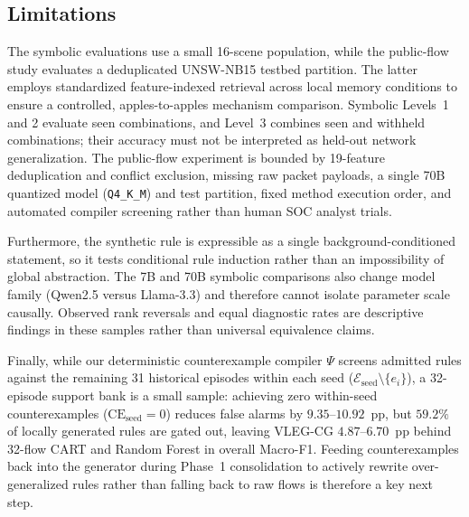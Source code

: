 \documentclass[10pt,a4paper,onecolumn]{article}
\theoremstyle{definition}
\theoremstyle{remark}
\begin{document}
\begin{enumerate}[leftmargin=1.8em]
\end{enumerate}

\subsection{Limitations}
\label{sec:limitations}
The symbolic evaluations use a small 16-scene population, while the public-flow study evaluates a deduplicated UNSW-NB15 testbed partition. The latter employs standardized feature-indexed retrieval across local memory conditions to ensure a controlled, apples-to-apples mechanism comparison. Symbolic Levels~1 and 2 evaluate seen combinations, and Level~3 combines seen and withheld combinations; their accuracy must not be interpreted as held-out network generalization. The public-flow experiment is bounded by 19-feature deduplication and conflict exclusion, missing raw packet payloads, a single 70B quantized model (\texttt{Q4\_K\_M}) and test partition, fixed method execution order, and automated compiler screening rather than human SOC analyst trials.

Furthermore, the synthetic rule is expressible as a single background-conditioned statement, so it tests conditional rule induction rather than an impossibility of global abstraction. The 7B and 70B symbolic comparisons also change model family (Qwen2.5 versus Llama-3.3) and therefore cannot isolate parameter scale causally. Observed rank reversals and equal diagnostic rates are descriptive findings in these samples rather than universal equivalence claims.

Finally, while our deterministic counterexample compiler $\Psi$ screens admitted rules against the remaining 31 historical episodes within each seed ($\mathcal{E}_{\mathrm{seed}} \setminus \{e_i\}$), a 32-episode support bank is a small sample: achieving zero within-seed counterexamples ($\mathrm{CE}_{\mathrm{seed}}=0$) reduces false alarms by $9.35$--$10.92$~pp, but $59.2\%$ of locally generated rules are gated out, leaving VLEG-CG $4.87$--$6.70$~pp behind 32-flow CART and Random Forest in overall Macro-F1. Feeding counterexamples back into the generator during Phase~1 consolidation to actively rewrite over-generalized rules rather than falling back to raw flows is therefore a key next step.
\end{document}
